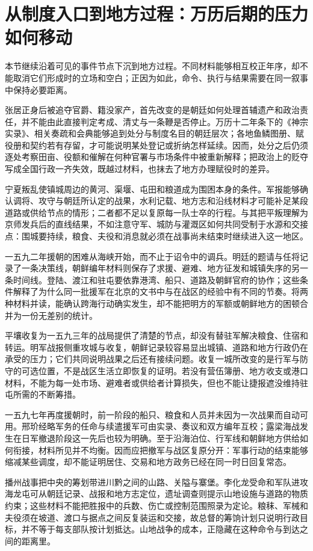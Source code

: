 \section{从制度入口到地方过程：万历后期的压力如何移动}

本节继续沿着可见的事件节点下沉到地方过程。不同材料能够相互校正年序，却不能取消它们形成时的立场和空白；正因为如此，命令、执行与结果需要在同一叙事中保持必要距离。

张居正身后被追夺官爵、籍没家产，首先改变的是朝廷如何处理首辅遗产和政治责任，并不能由此直接判定考成、清丈与一条鞭是否停止。万历十二年条下的《神宗实录》、相关奏疏和会典能够追到处分与制度名目的朝廷层次；各地鱼鳞图册、赋役册和契约若有存留，才可能说明某处登记或折纳怎样延续。因而，处分之后仍须逐处考察田亩、役额和催解在何种官署与市场条件中被重新解释；把政治上的贬夺写成全国行政一齐失效，既越过材料，也抹去了地方办理赋役时的差异。

宁夏叛乱使镇城周边的黄河、渠堰、屯田和粮道成为围困本身的条件。军报能够确认调将、攻守与朝廷所认定的战果，水利记载、地方志和沿线材料才可能补足某段道路或供给节点的情形；二者都不足以复原每一队士卒的行程。与其把平叛理解为京师发兵后的直线结果，不如注意守军、城防与灌溉区如何共同受制于水源和交接点：围城要持续，粮食、夫役和消息就必须在战事尚未结束时继续进入这一地区。

一五九二年援朝的困难从海峡开始，而不止于诏令中的调兵。明廷的题请与任将记录了一条决策线，朝鲜编年材料则保存了求援、避难、地方征发和城镇失序的另一条时间线。登陆、渡江和驻屯要依靠港湾、船只、道路及朝鲜官府的协作；这些条件解释了为什么同一批援军在北京的文书中与在战区的经验中有不同的节奏。将两种材料并读，能确认跨海行动确实发生，却不能把明方的军额或朝鲜地方的困顿合并为一份无差别的统计。

平壤收复为一五九三年的战局提供了清楚的节点，却没有替驻军解决粮食、住宿和转运。明军战报侧重攻城与收复，朝鲜记录较容易显出城镇、道路和地方行政仍在承受的压力；它们共同说明战果之后还有接续问题。收复一城所改变的是行军与防守的可选位置，不是战区生活立即恢复的证明。若没有营伍簿册、地方收支或港口材料，不能为每一处市场、避难者或供给者计算损失，但也不能让捷报遮没维持驻屯所需的不断筹措。

一五九七年再度援朝时，前一阶段的船只、粮食和人员并未因为一次战果而自动可用。邢玠经略军务的任命与续遣援军可由实录、奏议和双方编年互校；露梁海战发生在日军撤退阶段这一先后也较为明确。至于沿海泊位、行军线和朝鲜地方供给如何衔接，材料所见并不均衡。因而应把撤军与战区复原分开：军事行动的结束能够缩减某些调度，却不能证明居住、交易和地方政务已经在同一时日回复常态。

播州战事把中央的筹划带进川黔之间的山路、关隘与寨堡。李化龙受命和军队进攻海龙屯可从朝廷记录、战报和地方志定位，遗址调查则提示山地设施与道路的物质约束；这些材料不能把胜报中的兵数、伤亡或控制范围照录为定论。粮秣、军械和夫役须在坡道、渡口与据点之间反复装运和交接，故总督的筹饷计划只说明行政目标，并不等于每支部队按计划抵达。山地战争的成本，正隐藏在这种命令与到达之间的距离里。

